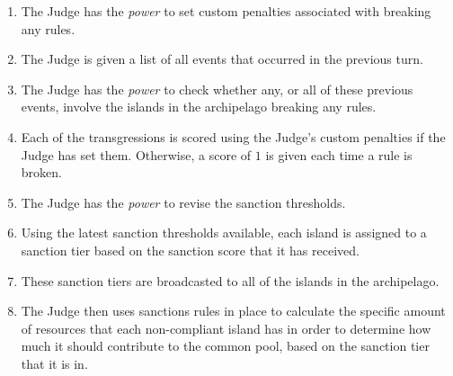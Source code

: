     






    \begin{enumerate}
        \item The Judge has the \emph{power} to set custom penalties associated with breaking any rules.
        \item The Judge is given a list of all events that occurred in the previous turn.
        \item The Judge has the \emph{power} to check whether any, or all of these previous events, involve the islands in the archipelago breaking any rules.
        \item Each of the transgressions is scored using the Judge's custom penalties if the Judge has set them. Otherwise, a score of $1$ is given each time a rule is broken.
        \item The Judge has the \emph{power} to revise the sanction thresholds.
        \item Using the latest sanction thresholds available, each island is assigned to a sanction tier based on the sanction score that it has received.
        \item These sanction tiers are broadcasted to all of the islands in the archipelago.
        \item The Judge then uses sanctions rules in place to calculate the specific amount of resources that each non-compliant island has in order to determine how much it should contribute to the common pool, based on the sanction tier that it is in.
    \end{enumerate}




